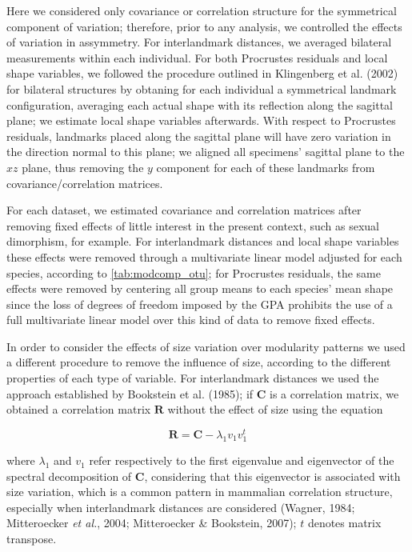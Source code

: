 \documentclass[12pt,twoside]{report}
\begin{document}
Here we considered only covariance or correlation structure for the
symmetrical component of variation; therefore, prior to any analysis, we
controlled the effects of variation in assymmetry. For interlandmark
distances, we averaged bilateral measurements within each individual.
For both Procrustes residuals and local shape variables, we followed the
procedure outlined in Klingenberg et al. (2002) for bilateral structures
by obtaning for each individual a symmetrical landmark configuration,
averaging each actual shape with its reflection along the sagittal
plane; we estimate local shape variables afterwards. With respect to
Procrustes residuals, landmarks placed along the sagittal plane will
have zero variation in the direction normal to this plane; we aligned
all specimens' sagittal plane to the $xz$ plane, thus removing the $y$
component for each of these landmarks from covariance/correlation
matrices.

For each dataset, we estimated covariance and correlation matrices after
removing fixed effects of little interest in the present context, such
as sexual dimorphism, for example. For interlandmark distances and local
shape variables these effects were removed through a multivariate linear
model adjusted for each species, according to \autoref{tab:modcomp_otu};
for Procrustes residuals, the same effects were removed by centering all
group means to each species' mean shape since the loss of degrees of
freedom imposed by the GPA prohibits the use of a full multivariate
linear model over this kind of data to remove fixed effects.

In order to consider the effects of size variation over modularity
patterns we used a different procedure to remove the influence of size,
according to the different properties of each type of variable. For
interlandmark distances we used the approach established by Bookstein et
al. (1985); if $\mathbf{C}$ is a correlation matrix, we obtained a
correlation matrix $\mathbf{R}$ without the effect of size using the
equation

\begin{equation}
\mathbf{R} = \mathbf{C} - \lambda_1 v_1 v^{t}_1
\label{eq:iso}
\end{equation}

where $\lambda_1$ and $v_1$ refer respectively to the first eigenvalue
and eigenvector of the spectral decomposition of $\mathbf{C}$,
considering that this eigenvector is associated with size variation,
which is a common pattern in mammalian correlation structure, especially
when interlandmark distances are considered (Wagner, 1984; Mitteroecker
\emph{et al.}, 2004; Mitteroecker \& Bookstein, 2007); $t$ denotes
matrix transpose.
\end{document}
